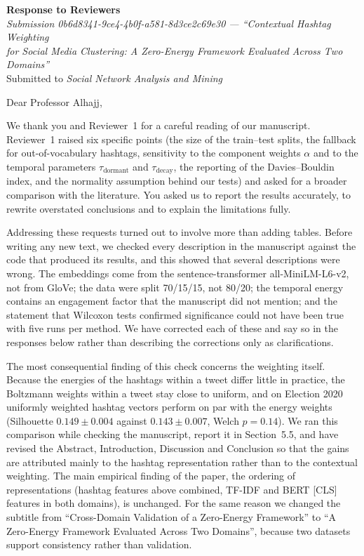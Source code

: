 \documentclass[11pt,a4paper]{article}
\begin{document}
\begin{center}
{\LARGE\bfseries\color{headblue} Response to Reviewers}\\[8pt]
{\large\itshape Submission 0b6d8341-9ce4-4b0f-a581-8d3ce2c69e30 --- ``Contextual Hashtag Weighting\\ for Social Media Clustering: A Zero-Energy Framework Evaluated Across Two Domains''}\\[6pt]
Submitted to \textit{Social Network Analysis and Mining}
\end{center}

\vspace{4pt}

Dear Professor Alhajj,

We thank you and Reviewer~1 for a careful reading of our manuscript. Reviewer~1 raised six specific points (the size of the train--test splits, the fallback for out-of-vocabulary hashtags, sensitivity to the component weights $\alpha$ and to the temporal parameters $\tau_{\text{dormant}}$ and $\tau_{\text{decay}}$, the reporting of the Davies--Bouldin index, and the normality assumption behind our tests) and asked for a broader comparison with the literature. You asked us to report the results accurately, to rewrite overstated conclusions and to explain the limitations fully.

Addressing these requests turned out to involve more than adding tables. Before writing any new text, we checked every description in the manuscript against the code that produced its results, and this showed that several descriptions were wrong. The embeddings come from the sentence-transformer all-MiniLM-L6-v2, not from GloVe; the data were split 70/15/15, not 80/20; the temporal energy contains an engagement factor that the manuscript did not mention; and the statement that Wilcoxon tests confirmed significance could not have been true with five runs per method. We have corrected each of these and say so in the responses below rather than describing the corrections only as clarifications.

The most consequential finding of this check concerns the weighting itself. Because the energies of the hashtags within a tweet differ little in practice, the Boltzmann weights within a tweet stay close to uniform, and on Election 2020 uniformly weighted hashtag vectors perform on par with the energy weights (Silhouette $0.149 \pm 0.004$ against $0.143 \pm 0.007$, Welch $p = 0.14$). We ran this comparison while checking the manuscript, report it in Section~5.5, and have revised the Abstract, Introduction, Discussion and Conclusion so that the gains are attributed mainly to the hashtag representation rather than to the contextual weighting. The main empirical finding of the paper, the ordering of representations (hashtag features above combined, TF-IDF and BERT [CLS] features in both domains), is unchanged. For the same reason we changed the subtitle from ``Cross-Domain Validation of a Zero-Energy Framework'' to ``A Zero-Energy Framework Evaluated Across Two Domains'', because two datasets support consistency rather than validation.
\end{document}
